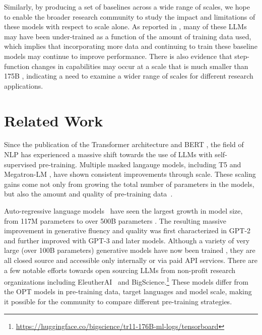 \documentclass[11pt]{article}
\newcommand{\biggpt}[1]{{GPT-3#1}}
\begin{document}
Similarly, by producing a set of baselines across a wide range of scales, we hope to enable the broader research community to study the impact and limitations of these models with respect to scale alone. As reported in \citet{chinchilla2022}, many of these LLMs may have been under-trained as a function of the amount of training data used, which implies that incorporating more data and continuing to train these baseline models may continue to improve performance.  There is also evidence that step-function changes in capabilities may occur at a scale that is much smaller than 175B \cite{flan2021}, indicating a need to examine a wider range of scales for different research applications.
 \section{Related Work}
\label{sec:related_work}

Since the publication of the Transformer architecture \cite{vaswani2017attention} and BERT \cite{devlin2018bert}, the field of NLP has experienced a massive shift towards the use of LLMs with self-supervised pre-training. 
Multiple masked langauge models, including T5 \cite{raffel2020exploring} and Megatron-LM \cite{shoeybi2019megatron}, have shown consistent improvements through scale. These scaling gains come not only from growing the total number of parameters in the models, but also the amount and quality of pre-training data~\cite{liu2019roberta,chinchilla2022}.  

Auto-regressive language models~\cite{mikolov2009neural} have seen the largest growth in model size, from 117M parameters \cite{radford2018gpt} to over 500B parameters \cite{megatron2022,palm2022}. The resulting massive improvement in generative fluency and quality was first characterized in GPT-2 \cite{radford2019language} and further improved with \biggpt{} \cite{brown2020gpt3} and later models. Although a variety of very large (over 100B parameters) generative models have now been trained \cite{J1WhitePaper,gopher2022,thoppilan2022lamda,megatron2022,palm2022}, they are all closed source and accessible only internally or via paid API services. There are a few notable efforts towards open sourcing LLMs from non-profit research organizations including EleutherAI~\cite{eleutherai2022} and BigScience.\footnote{\url{https://huggingface.co/bigscience/tr11-176B-ml-logs/tensorboard}} These models differ from the OPT models in pre-training data, target languages and model scale, making it possible for the community to compare different pre-training strategies.
\end{document}

